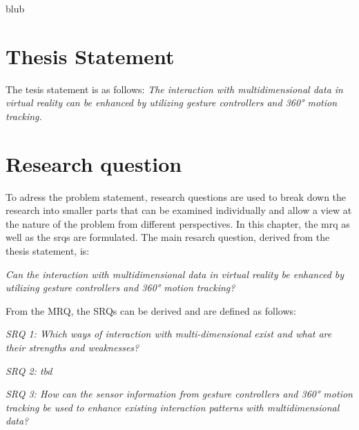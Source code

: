 blub



\section{Thesis Statement}

The tesis statement is as follows: \newline
\textit{The interaction with multidimensional data in virtual reality can be enhanced by utilizing gesture controllers and 360° motion tracking.}



\section{Research question}

To adress the problem statement, research questions are used to break down the research into smaller parts that can be examined individually and allow a view at the nature of the problem from different perspectives.
In this chapter, the \gls{mrq} as well as the \glspl{srq} are formulated. \newline
The main resarch question, derived from the thesis statement, is:
\begin{framed}
	\textit{Can the interaction with multidimensional data in virtual reality be enhanced by utilizing gesture controllers and 360° motion tracking?}
\end{framed} \label{MRQ}
From the MRQ, the SRQs can be derived and are defined as follows:
\begin{framed}
	\textit{SRQ 1: Which ways of interaction with multi-dimensional exist and what are their strengths and weaknesses?}
\end{framed} \label{SRQ1}
\begin{framed}
	\textit{SRQ 2: tbd}
\end{framed} \label{SRQ2}
\begin{framed}
	\textit{SRQ 3: How can the sensor information from gesture controllers and 360° motion tracking be used to enhance existing interaction patterns with multidimensional data?}
\end{framed} \label{SRQ3}
 

